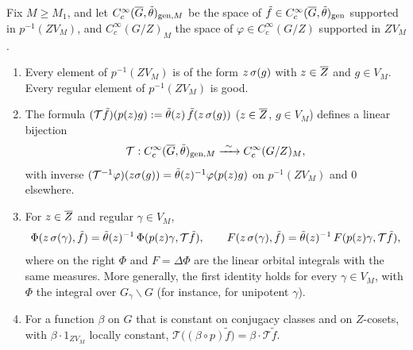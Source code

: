 Fix $M\ge M_1$, and let $C_c^\infty(\overline{G},\tilde\theta)_{\mathrm{gen},M}$ be the space of $\tilde f\in C_c^\infty(\overline{G},\tilde\theta)_{\mathrm{gen}}$ supported in $p^{-1}(ZV_M)$, and $C_c^\infty(G/Z)_M$ the space of $\varphi\in C_c^\infty(G/Z)$ supported in $ZV_M$.

\begin{proposition}[Transport]\label{II:prop:transport}
\begin{enumerate}[label=(\alph*)]
\item Every element of $p^{-1}(ZV_M)$ is of the form $z\,\sigma(g)$ with $z\in\overline{Z}$ and $g\in V_M$. Every regular element of $p^{-1}(ZV_M)$ is good.
\item The formula $(\mathcal T\tilde f)(p(z)g):=\tilde\theta(z)\,\tilde f(z\,\sigma(g))$ ($z\in\overline{Z}$, $g\in V_M$) defines a linear bijection
\[ \mathcal T:C_c^\infty(\Gb,\tilde\theta)_{\gen,M}\xrightarrow{\ \sim\ }C_c^\infty(G/Z)_M, \]
with inverse $(\mathcal T^{-1}\varphi)(z\sigma(g))=\tilde\theta(z)^{-1}\varphi(p(z)g)$ on $p^{-1}(ZV_M)$ and $0$ elsewhere.
\item For $z\in\overline{Z}$ and regular $\gamma\in V_M$,
\[ \Phi(z\,\sigma(\gamma),\tilde f)=\tilde\theta(z)^{-1}\,\Phi(p(z)\gamma,\mathcal T\tilde f),\qquad F(z\,\sigma(\gamma),\tilde f)=\tilde\theta(z)^{-1}\,F(p(z)\gamma,\mathcal T\tilde f), \]
where on the right $\Phi$ and $F=\Delta\Phi$ are the linear orbital integrals with the same measures. More generally, the first identity holds for every $\gamma\in V_M$, with $\Phi$ the integral over $G_\gamma\backslash G$ (for instance, for unipotent $\gamma$).
\item For a function $\beta$ on $G$ that is constant on conjugacy classes and on $Z$-cosets, with $\beta\cdot1_{ZV_M}$ locally constant, $\mathcal T\big((\beta\circ p)\tilde f\big)=\beta\cdot\mathcal T\tilde f$.
\end{enumerate}
\end{proposition}

